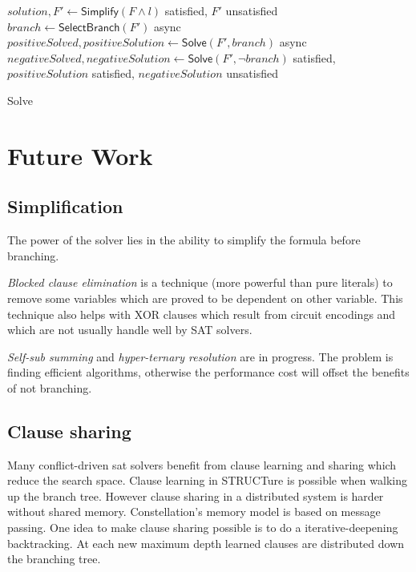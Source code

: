 \documentclass[12pt]{article}
\begin{document}
\begin{algorithm}[h!]
\begin{algorithmic}

\STATE $solution, F' \gets \textsf{Simplify}(F \land l)$
  \RETURN satisfied, $F'$
  \RETURN unsatisfied
  \STATE $branch \gets \textsf{SelectBranch}(F')$
  \STATE async $positiveSolved, positiveSolution \gets \textsf{Solve}(F', branch)$
  \STATE async $negativeSolved, negativeSolution \gets \textsf{Solve}(F', \neg branch)$
    \RETURN satisfied, $positiveSolution$
    \RETURN satisfied, $negativeSolution$
  \ELSE
    \RETURN unsatisfied
  \ENDIF
\ENDIF
\end{algorithmic}
\caption{Solve}
\label{alg:solve}
\end{algorithm}


\section{Future Work}


\subsection{Simplification}

The power of the solver lies in the ability to simplify the formula before branching.

\emph{Blocked clause elimination} is a technique (more powerful than pure literals) to remove some
variables which are proved to be dependent on other variable. This technique also helps with XOR
clauses which result from circuit encodings and which are not usually handle well by SAT solvers.

\emph{Self-sub summing} and \emph{hyper-ternary resolution} are in progress. The problem is
finding efficient algorithms, otherwise the performance cost will offset the benefits of
not branching.


\subsection{Clause sharing}

Many conflict-driven sat solvers benefit from clause learning and sharing which reduce the search
space. Clause learning in STRUCTure is possible when walking up the branch tree.  However clause
sharing in a distributed system is harder without shared memory. Constellation's memory model is
based on message passing.  One idea to make clause sharing possible is to do a iterative-deepening
backtracking. At each new maximum depth learned clauses are distributed down the branching tree.
\end{document}
